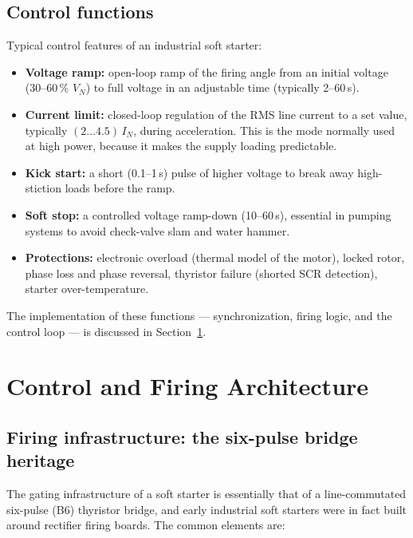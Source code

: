 \documentclass[11pt,a4paper]{article}
\begin{document}
\subsection{Control functions}

Typical control features of an industrial soft starter:

\begin{itemize}
  \item \textbf{Voltage ramp:} open-loop ramp of the firing angle from an
        initial voltage (30--60\,\% $V_N$) to full voltage in an adjustable
        time (typically 2--60\,\si{\second}).
  \item \textbf{Current limit:} closed-loop regulation of the RMS line
        current to a set value, typically $(2\ldots4.5)\,I_N$, during
        acceleration. This is the mode normally used at high power, because
        it makes the supply loading predictable.
  \item \textbf{Kick start:} a short (0.1--1\,\si{\second}) pulse of higher
        voltage to break away high-stiction loads before the ramp.
  \item \textbf{Soft stop:} a controlled voltage ramp-down (10--60\,\si{\second}),
        essential in pumping systems to avoid check-valve slam and water
        hammer.
  \item \textbf{Protections:} electronic overload (thermal model of the
        motor), locked rotor, phase loss and phase reversal, thyristor
        failure (shorted SCR detection), starter over-temperature.
\end{itemize}

The implementation of these functions --- synchronization, firing logic, and
the control loop --- is discussed in Section~\ref{sec:control}.

\section{Control and Firing Architecture}
\label{sec:control}

\subsection{Firing infrastructure: the six-pulse bridge heritage}

The gating infrastructure of a soft starter is essentially that of a
line-commutated six-pulse (B6) thyristor bridge, and early industrial soft
starters were in fact built around rectifier firing boards. The common
elements are:
\end{document}
